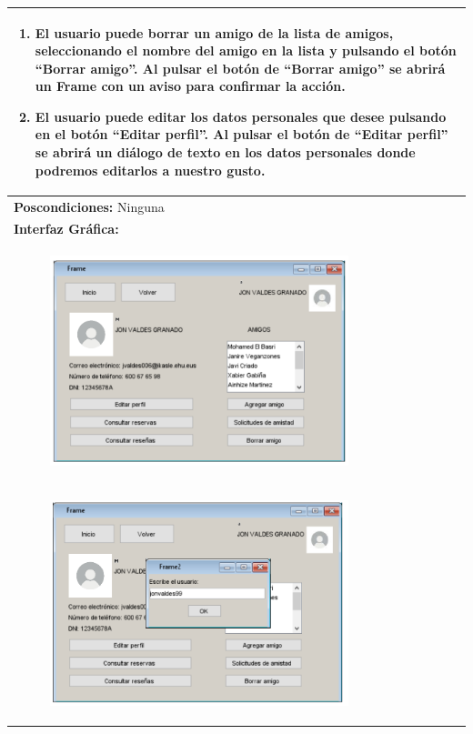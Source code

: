 \documentclass{report}
\begin{document}
\begin{center}
\begin{longtable}{|p{\linewidth}|}
\begin{enumerate}
                            \item El usuario puede borrar un amigo de la lista de amigos, seleccionando el nombre del amigo en la lista y pulsando el botón “Borrar amigo”. Al pulsar el botón de “Borrar amigo” se abrirá un Frame con un aviso para confirmar la acción.
                            \item El usuario puede editar los datos personales que desee pulsando en el botón “Editar perfil”. Al pulsar el botón de “Editar perfil” se abrirá un diálogo de texto en los datos personales donde podremos editarlos a nuestro gusto.  
                        \end{enumerate}\\
                        \hline
                        \textbf{Poscondiciones:} Ninguna\\
                        \hline
                        \textbf{Interfaz Gráfica:}\\
                        \begin{figure}[H]
                            \centering
                            \includegraphics[width=0.8\textwidth]{./img/grafico/InterfazMenu.png}
                        \end{figure}\\
                        \hline
                        \begin{figure}[H]
                            \centering
                            \includegraphics[width=0.8\textwidth]{./img/grafico/InterfazAnadrAmigo.png}

\end{figure}
\end{longtable}
\end{center}
\end{document}
